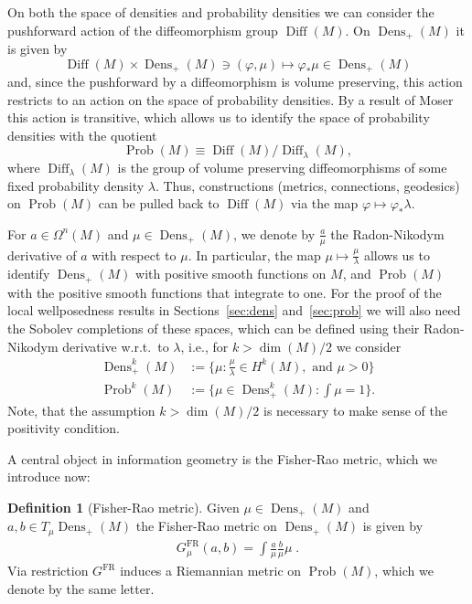 \documentclass[11pt]{amsart}
\theoremstyle{definition}
\newtheorem{definition}[theorem]{Definition}
\newcommand{\dx}{\lambda}
\newcommand{\Prob}{\operatorname{Prob}(M)}
\newcommand{\Probk}{\operatorname{Prob}^k(M)}
\newcommand{\Dens}{\operatorname{Dens}_+(M)}
\newcommand{\Densk}{\operatorname{Dens}^k_+(M)}
\newcommand{\Diff}{\operatorname{Diff}(M)}
\newcommand{\SDiff}{\operatorname{Diff}_{\dx}(M)}
\newcommand{\GFR}{G^{\mathrm{FR}}}
\begin{document}
On both the space of  densities and probability densities
we can consider the pushforward action of the diffeomorphism group $\Diff$.  On $\Dens$ it is given by
\begin{equation}\label{eq:pushforward}
\Diff\times \Dens\ni (\varphi,\mu)\mapsto \varphi_*\mu \in \Dens
\end{equation}
and, since the pushforward by a diffeomorphism is volume preserving, this action restricts to an action on the space of probability densities. 
By a result of Moser~\cite{moser1965volume} this action is transitive, which allows us to identify the space of probability densities with the quotient
\begin{equation}
\Prob\equiv \Diff/\SDiff, 
\end{equation}
where $\SDiff$ is the group of volume preserving diffeomorphisms of some fixed probability density $\dx$. 
Thus, constructions (metrics, connections, geodesics) on $\Prob$ can be pulled back to $\Diff$ via the map $\varphi\mapsto \varphi_*\dx$.

For $a\in \Omega^n(M)$ and $\mu\in \Dens$, we denote by $\frac{a}{\mu}$ the Radon-Nikodym derivative of $a$ with respect to $\mu$.
In particular, the map $\mu \mapsto \frac{\mu}{\dx}$ allows us to identify $\Dens$ with positive smooth functions on $M$, and $\Prob$ with the positive smooth functions that integrate to one.
For the proof of the local wellposedness results in Sections~\ref{sec:dens} and~\ref{sec:prob} we will also need the Sobolev completions of these spaces, which can be defined using their  Radon-Nikodym derivative w.r.t.\ to $\dx$, i.e., for $k>\operatorname{dim}(M)/2$ we consider
\begin{align*}
\Densk&:=\{\mu:\frac{\mu}{\dx}\in H^{k}(M), \text{ and } \mu>0\}\\
\Probk&:=\{\mu\in \Densk : \int\mu=1\}.
\end{align*}
Note, that the assumption  $k>\operatorname{dim}(M)/2$ is necessary to make sense of the positivity condition.



A central object in information geometry is the Fisher-Rao metric, which we introduce now:
\begin{definition}[Fisher-Rao metric]
Given $\mu\in \Dens$ and $a,b\in T_\mu\Dens$ the Fisher-Rao metric on $\Dens$ is given by
\begin{align}\label{fisher-rao}
\GFR_{\mu}(a,b)=\int \frac{a}{\mu} \frac{b}{\mu}\mu\;.
\end{align}
Via restriction $\GFR$ induces a Riemannian metric on $\Prob$, which we denote by the same letter.
\end{definition}
\end{document}
